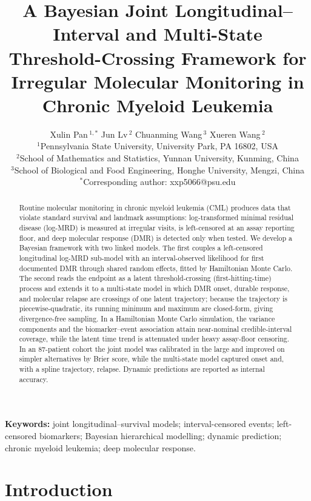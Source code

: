 \documentclass[11pt]{article}
\title{A Bayesian Joint Longitudinal--Interval and Multi-State
Threshold-Crossing Framework for Irregular Molecular Monitoring in Chronic
Myeloid Leukemia}
\author{
  Xulin Pan\,$^{1,\ast}$ \quad Jun Lv\,$^{2}$ \quad Chuanming Wang\,$^{3}$ \quad
  Xueren Wang\,$^{2}$ \\[6pt]
  \small $^{1}$Pennsylvania State University, University Park, PA 16802, USA\\
  \small $^{2}$School of Mathematics and Statistics, Yunnan University, Kunming, China\\
  \small $^{3}$School of Biological and Food Engineering, Honghe University, Mengzi, China\\
  \small $^{\ast}$Corresponding author: xxp5066@psu.edu
}
\date{}
\begin{document}
\maketitle

\begin{abstract}
Routine molecular monitoring in chronic myeloid leukemia (CML) produces data
that violate standard survival and landmark assumptions: log-transformed
minimal residual disease (log-MRD) is measured at irregular visits, is
left-censored at an assay reporting floor, and deep molecular response (DMR) is
detected only when tested. We develop a Bayesian framework with
two linked models. The first couples a left-censored longitudinal log-MRD sub-model with an
interval-observed likelihood for first documented DMR through shared random
effects, fitted by Hamiltonian Monte Carlo. The second reads the
endpoint as a latent threshold-crossing (first-hitting-time) process and
extends it to a multi-state model in which DMR onset, durable response, and
molecular relapse are crossings of one latent trajectory; because
the trajectory is piecewise-quadratic, its running minimum and maximum are
closed-form, giving divergence-free sampling. In a Hamiltonian Monte Carlo simulation, the variance components and the
biomarker--event association attain near-nominal credible-interval coverage,
while the latent time trend is attenuated under heavy assay-floor censoring. In an 87-patient cohort the joint model was
calibrated in the large and improved on simpler alternatives by Brier score,
while the multi-state model captured onset and, with a spline trajectory,
relapse. Dynamic predictions are reported as internal accuracy.
\end{abstract}

\noindent\textbf{Keywords:} joint longitudinal--survival models;
interval-censored events; left-censored biomarkers; Bayesian hierarchical
modelling; dynamic prediction; chronic myeloid leukemia; deep molecular
response.

\section{Introduction}
\end{document}
